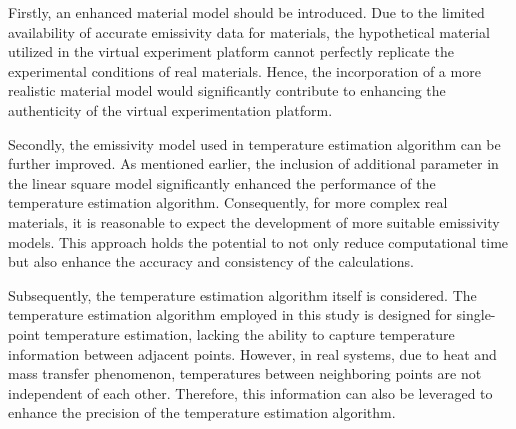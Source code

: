 Firstly, an enhanced material model should be introduced. Due to the limited availability 
of accurate emissivity data for materials, the hypothetical material utilized in the virtual 
experiment platform cannot perfectly replicate the experimental conditions of real materials. 
Hence, the incorporation of a more realistic material model would significantly contribute to 
enhancing the authenticity of the virtual experimentation platform.


Secondly, the emissivity model used in temperature estimation algorithm can be further 
improved. As mentioned earlier, the inclusion of additional parameter in the linear square 
model significantly enhanced the performance of the temperature estimation algorithm. 
Consequently, for more complex real materials, it is reasonable to expect the development of 
more suitable emissivity models. This approach holds the potential to not only reduce 
computational time but also enhance the accuracy and consistency of the calculations.


Subsequently, the temperature estimation algorithm itself is considered. The temperature 
estimation algorithm employed in this study is designed for single-point temperature estimation, 
lacking the ability to capture temperature information between adjacent points. 
However, in real systems, due to heat and mass transfer phenomenon, temperatures between 
neighboring points are not independent of each other. Therefore, this information can also be 
leveraged to enhance the precision of the temperature estimation algorithm.




